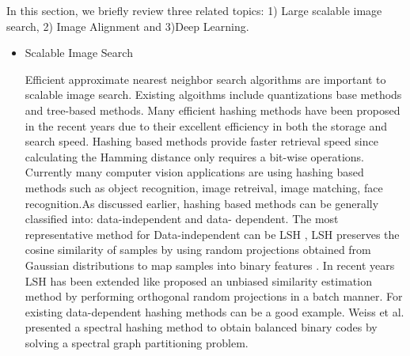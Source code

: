\documentclass[12pt, a4paper,twoside]{article}
\begin{document}
\label{sec:Background}
In this section, we briefly review three related topics: 1) Large scalable image search, 2) Image Alignment and 3)Deep Learning.
\begin{itemize}
	\item Scalable Image Search

	Efficient approximate nearest neighbor search algorithms are important to scalable image search. Existing algoithms include quantizations
	base methods and tree-based methods. Many efficient hashing methods have been proposed in the recent years due to their excellent 
	efficiency in both the storage and search speed. Hashing based methods provide faster retrieval speed since calculating the Hamming distance 
	only requires a bit-wise operations. Currently many computer vision applications are using hashing based methods such as object recognition,
	image retreival, image matching, face recognition.As discussed earlier, hashing based methods can be generally classified into: data-independent and data-
	dependent. The most representative method for Data-independent can be LSH , LSH preserves the cosine similarity of samples by using random projections obtained from Gaussian distributions	to map samples into binary features \cite{LSH}. In recent years LSH has been extended like  \cite{unbiased} proposed an unbiased
	similarity estimation method by performing orthogonal random projections in a batch manner. For existing data-dependent hashing methods can be a good example. Weiss et al. \cite{81} presented a spectral hashing method to obtain balanced binary codes by solving a spectral graph partitioning problem.  

\end{itemize}
\end{document}
